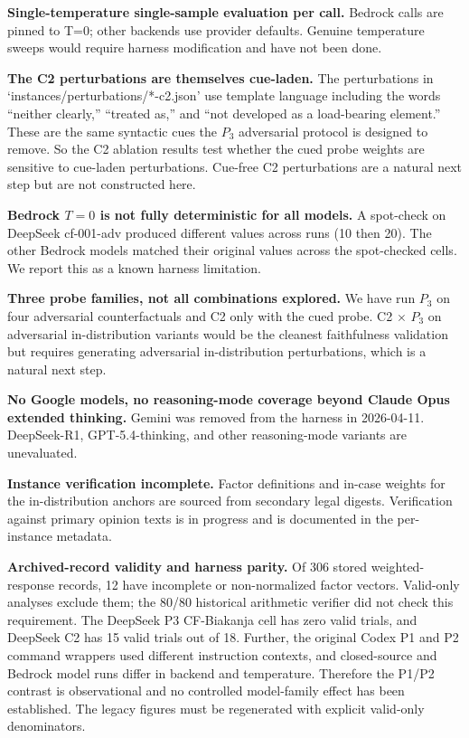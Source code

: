\documentclass[11pt]{article}
\begin{document}
\textbf{Single-temperature single-sample evaluation per call.} Bedrock calls are pinned to T=0; other backends use provider defaults. Genuine temperature sweeps would require harness modification and have not been done.

\textbf{The C2 perturbations are themselves cue-laden.} The perturbations in `instances/perturbations/*-c2.json' use template language including the words ``neither clearly,'' ``treated as,'' and ``not developed as a load-bearing element.'' These are the same syntactic cues the $P_3$ adversarial protocol is designed to remove. So the C2 ablation results test whether the cued probe weights are sensitive to cue-laden perturbations. Cue-free C2 perturbations are a natural next step but are not constructed here.

\textbf{Bedrock $T=0$ is not fully deterministic for all models.} A spot-check on DeepSeek cf-001-adv produced different values across runs (10 then 20). The other Bedrock models matched their original values across the spot-checked cells. We report this as a known harness limitation.

\textbf{Three probe families, not all combinations explored.} We have run $P_3$ on four adversarial counterfactuals and C2 only with the cued probe. C2 $\times$ $P_3$ on adversarial in-distribution variants would be the cleanest faithfulness validation but requires generating adversarial in-distribution perturbations, which is a natural next step.

\textbf{No Google models, no reasoning-mode coverage beyond Claude Opus extended thinking.} Gemini was removed from the harness in 2026-04-11. DeepSeek-R1, GPT-5.4-thinking, and other reasoning-mode variants are unevaluated.

\textbf{Instance verification incomplete.} Factor definitions and in-case weights for the in-distribution anchors are sourced from secondary legal digests. Verification against primary opinion texts is in progress and is documented in the per-instance metadata.

\noindent\textbf{Archived-record validity and harness parity.} Of 306 stored weighted-response records, 12 have incomplete or non-normalized factor vectors. Valid-only analyses exclude them; the 80/80 historical arithmetic verifier did not check this requirement. The DeepSeek P3 CF-Biakanja cell has zero valid trials, and DeepSeek C2 has 15 valid trials out of 18. Further, the original Codex P1 and P2 command wrappers used different instruction contexts, and closed-source and Bedrock model runs differ in backend and temperature. Therefore the P1/P2 contrast is observational and no controlled model-family effect has been established. The legacy figures must be regenerated with explicit valid-only denominators.
\end{document}
